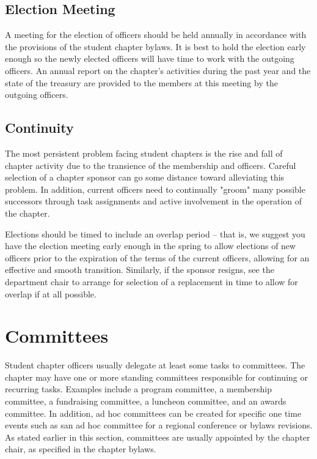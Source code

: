 \subsection*{Election Meeting}
A meeting for the election of officers should be held annually in accordance
with the provisions of the student chapter bylaws. It is best to hold the election
early enough so the newly elected officers will have time to work with the
outgoing officers. An annual report on the chapter's activities during the past
year and the state of the treasury are provided to the members at this meeting
by the outgoing officers.

\subsection*{Continuity}
The most persistent problem facing student chapters is the rise and fall of
chapter activity due to the transience of the membership and officers. Careful
selection of a chapter sponsor can go some distance toward alleviating this
problem. In addition, current officers need to continually "groom" many possible
successors through task assignments and active involvement in the operation of
the chapter.

Elections should be timed to include an overlap period -- that is, we suggest
you have the election meeting early enough in the spring to allow elections of
new officers prior to the expiration of the terms of the current officers,
allowing for an effective and smooth transition. Similarly, if the sponsor
resigns, see the department chair to arrange for selection of a replacement in
time to allow for overlap if at all possible.

\section{Committees}
\label{sec:committees}

Student chapter officers usually delegate at least some tasks to committees. The
chapter may have one or more standing committees responsible for continuing or
recurring tasks. Examples include a program committee, a membership committee,
a fundraising committee, a luncheon committee, and an awards committee. In
addition, ad hoc committees can be created for specific one time events such as
san ad hoc committee for a regional conference or bylaws revisions. As stated
earlier in this section, committees are usually appointed by the chapter chair,
as specified in the chapter bylaws.

